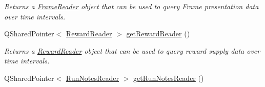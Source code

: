 \begin{DoxyCompactItemize}
\begin{DoxyCompactList}\small\item\em Returns a \hyperlink{class_picto_1_1_frame_reader}{Frame\-Reader} object that can be used to query Frame presentation data over time intervals. \end{DoxyCompactList}\item 
\hypertarget{class_picto_1_1_session_state_a05f2ab5ccc069e196c24b794fd4dc3b9}{Q\-Shared\-Pointer$<$ \hyperlink{class_picto_1_1_reward_reader}{Reward\-Reader} $>$ \hyperlink{class_picto_1_1_session_state_a05f2ab5ccc069e196c24b794fd4dc3b9}{get\-Reward\-Reader} ()}\label{class_picto_1_1_session_state_a05f2ab5ccc069e196c24b794fd4dc3b9}

\begin{DoxyCompactList}\small\item\em Returns a \hyperlink{class_picto_1_1_reward_reader}{Reward\-Reader} object that can be used to query reward supply data over time intervals. \end{DoxyCompactList}\item 
\hypertarget{class_picto_1_1_session_state_ad15c37c0d357f376a4a5ed93f857ece1}{Q\-Shared\-Pointer$<$ \hyperlink{class_picto_1_1_run_notes_reader}{Run\-Notes\-Reader} $>$ \hyperlink{class_picto_1_1_session_state_ad15c37c0d357f376a4a5ed93f857ece1}{get\-Run\-Notes\-Reader} ()}\label{class_picto_1_1_session_state_ad15c37c0d357f376a4a5ed93f857ece1}


\end{DoxyCompactItemize}

